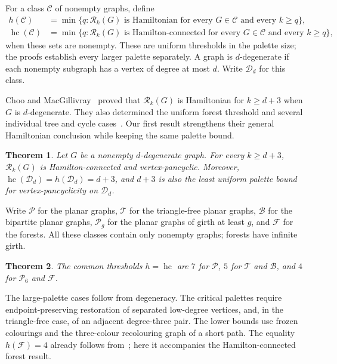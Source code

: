 \documentclass[11pt]{article}
\newtheorem{theorem}{Theorem}[section]
\theoremstyle{remark}
\newcommand{\Rk}{\mathcal R_k}
\newcommand{\hc}{\operatorname{hc}}
\numberwithin{equation}{section}
\numberwithin{table}{section}
\begin{document}
For a class $\mathcal C$ of nonempty graphs, define
\begin{align*}
 h(\mathcal C)&=\min\{q:\Rk(G)\text{ is Hamiltonian for every }G\in\mathcal C
                      \text{ and every }k\ge q\},\\
 \hc(\mathcal C)&=\min\{q:\Rk(G)\text{ is Hamilton-connected for every }G\in\mathcal C
                      \text{ and every }k\ge q\},
\end{align*}
when these sets are nonempty. These are uniform thresholds in the
palette size; the proofs establish every larger palette separately.
A graph is $d$-degenerate if each nonempty subgraph has a vertex of
degree at most $d$. Write $\mathcal D_d$ for this class.

Choo and MacGillivray~\cite[Theorem~3.4]{ChMa11} proved that
$\Rk(G)$ is Hamiltonian for $k\ge d+3$ when $G$ is $d$-degenerate.
They also determined the uniform forest threshold and several
individual tree and cycle cases~\cite[Sections~5--6]{ChMa11}.
Our first result strengthens their general Hamiltonian conclusion
while keeping the same palette bound.

\begin{theorem}\label{thm:main-degenerate}
Let $G$ be a nonempty $d$-degenerate graph. For every $k\ge d+3$,
$\Rk(G)$ is Hamilton-connected and vertex-pancyclic. Moreover,
$\hc(\mathcal D_d)=h(\mathcal D_d)=d+3$, and $d+3$ is also the least uniform palette
bound for vertex-pancyclicity on $\mathcal D_d$.
\end{theorem}

Write $\mathcal P$ for the planar graphs, $\mathcal T$ for the
triangle-free planar graphs, $\mathcal B$ for the bipartite planar
graphs, $\mathcal P_g$ for the planar graphs of girth at least $g$,
and $\mathcal F$ for the forests. All these classes contain only
nonempty graphs; forests have infinite girth.

\begin{theorem}\label{thm:main-planar}
The common thresholds $h=\hc$ are $7$ for $\mathcal P$,
$5$ for $\mathcal T$ and $\mathcal B$, and $4$ for
$\mathcal P_6$ and $\mathcal F$.
\end{theorem}

The large-palette cases follow from degeneracy. The critical palettes
require endpoint-preserving restoration of separated low-degree
vertices, and, in the triangle-free case, of an adjacent degree-three
pair. The lower bounds use frozen colourings and the three-colour
recolouring graph of a short path. The equality $h(\mathcal F)=4$
already follows from~\cite{ChMa11}; here it accompanies the
Hamilton-connected forest result.
\end{document}
